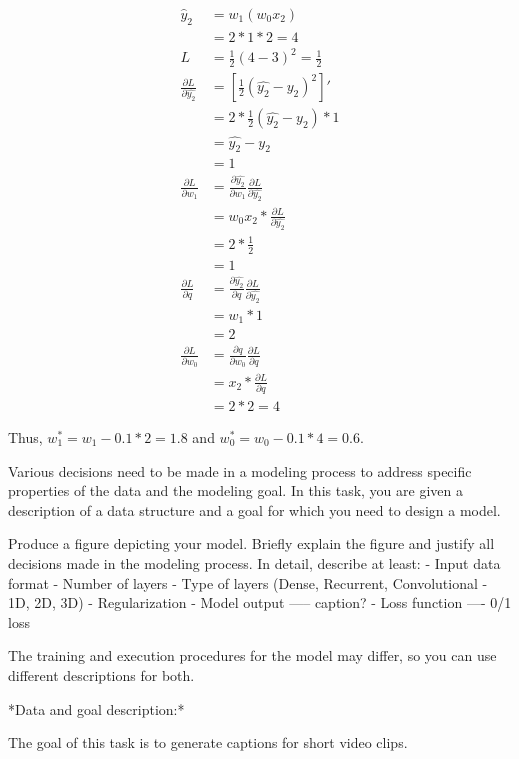 \documentclass[10pt]{article}
\newcounter{rcounter}
\newenvironment{rlist}%
{\begin{list}{\setnr-\arabic{rcounter}}{\usecounter{rcounter}}}{\end{list}}
\begin{document}
\begin{rlist}
\begin{align*}
\hat{y}_2 &= w_1(w_0x_2)\\
	&= 2*1*2 = 4\\
L &= \frac{1}{2}(4-3)^2 = \frac{1}{2}\\
\frac{\partial L}{\partial \hat{y_2}} &= [\frac{1}{2} (\hat{y_2}-y_2)^2]'\\
	&= 2*\frac{1}{2} (\hat{y_2}-y_2) * 1\\
	&= \hat{y_2}-y_2 \\
	&= 1\\
\frac{\partial L}{\partial w_1} &= \frac{\partial \hat{y_2}}{\partial w_1} \frac{\partial L}{\partial \hat{y_2}}\\
	&=  w_0x_2*\frac{\partial L}{\partial \hat{y_2}}\\
	&=  2*\frac{1}{2}\\
	&= 1\\
\frac{\partial L}{\partial q} &= \frac{\partial \hat{y_2}}{\partial q} \frac{\partial L}{\partial \hat{y_2}}\\
	&= w_1 * 1\\
	&= 2\\
\frac{\partial L}{\partial w_0} &= \frac{\partial q}{\partial w_0} \frac{\partial L}{\partial q}\\
	&= x_2 *\frac{\partial L}{\partial q}\\
	&= 2*2 = 4
\end{align*}

Thus, $w_1^* = w_1-0.1*2 = 1.8$ and $w_0^* = w_0 - 0.1*4 = 0.6$.



\item
Various decisions need to be made in a modeling process to address specific properties of the data and the modeling goal. In this task, you are given a description of a data structure and a goal for which you need to design a model. 

Produce a figure depicting your model. Briefly explain the figure and justify all decisions made in the modeling process. In detail, describe at least: 
- Input data format
- Number of layers
- Type of layers (Dense, Recurrent, Convolutional - 1D, 2D, 3D)
- Regularization
- Model output ----- caption? 
- Loss function  ---- 0/1 loss


The training and execution procedures for the model may differ, so you can use different descriptions for both. 

*Data and goal description:*

The goal of this task is to generate captions for short video clips. 


\end{rlist}
\end{document}

